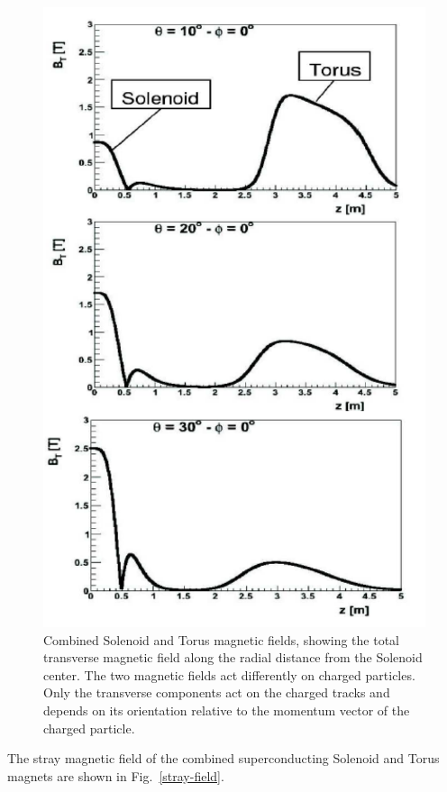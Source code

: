 \documentclass[final,3p,twocolumn]{elsarticle}
\begin{document}
\begin{figure}[htbp!]
\centerline{\includegraphics[width=1.0\columnwidth]{magfield.png}}
\caption{Combined Solenoid and Torus magnetic fields, showing the total transverse magnetic field along 
the radial distance from the Solenoid center. The two magnetic fields act differently on charged particles.
Only the transverse components act on the charged tracks and depends on its orientation relative to the 
momentum vector of the charged particle.} 
\label{solenoid-torus}
\end{figure}

The stray magnetic field of the combined superconducting Solenoid and Torus magnets are shown in Fig.~\ref{stray-field}. 
\end{document}
